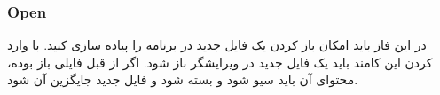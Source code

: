 \subsubsection*{{\titr Open}}


در این فاز باید امکان باز کردن یک فایل جدید در برنامه را پیاده سازی کنید. با وارد کردن این کامند باید یک فایل جدید در ویرایشگر باز شود. اگر از قبل فایلی باز بوده، محتوای آن باید سیو شود و بسته شود و فایل جدید جایگزین آن شود.


